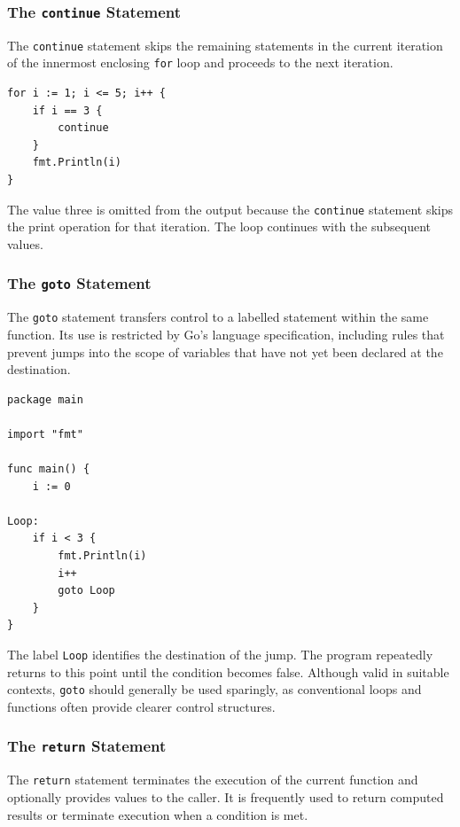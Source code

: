 \subsubsection{The \texttt{continue} Statement}

The \texttt{continue} statement skips the remaining statements
in the current iteration of the innermost enclosing
\texttt{for} loop and proceeds to the next iteration.

\begin{lstlisting}
for i := 1; i <= 5; i++ {
    if i == 3 {
        continue
    }
    fmt.Println(i)
}
\end{lstlisting}

The value three is omitted from the output because the
\texttt{continue} statement skips the print operation for
that iteration. The loop continues with the subsequent
values.

\subsubsection{The \texttt{goto} Statement}

The \texttt{goto} statement transfers control to a labelled
statement within the same function. Its use is restricted
by Go's language specification, including rules that prevent
jumps into the scope of variables that have not yet been
declared at the destination.

\begin{lstlisting}
package main

import "fmt"

func main() {
    i := 0

Loop:
    if i < 3 {
        fmt.Println(i)
        i++
        goto Loop
    }
}
\end{lstlisting}

The label \texttt{Loop} identifies the destination of the
jump. The program repeatedly returns to this point until
the condition becomes false. Although valid in suitable
contexts, \texttt{goto} should generally be used sparingly,
as conventional loops and functions often provide clearer
control structures.

\subsubsection{The \texttt{return} Statement}

The \texttt{return} statement terminates the execution of
the current function and optionally provides values to
the caller. It is frequently used to return computed
results or terminate execution when a condition is met.

